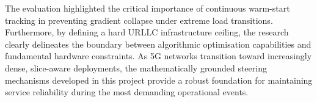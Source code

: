 \documentclass[11pt,a4paper,english]{article}
\begin{document}
The evaluation highlighted the critical importance of continuous warm-start tracking in preventing gradient collapse under extreme load transitions. Furthermore, by defining a hard URLLC infrastructure ceiling, the research clearly delineates the boundary between algorithmic optimisation capabilities and fundamental hardware constraints. As 5G networks transition toward increasingly dense, slice-aware deployments, the mathematically grounded steering mechanisms developed in this project provide a robust foundation for maintaining service reliability during the most demanding operational events.




\IMTAcoverpage
\end{document}
